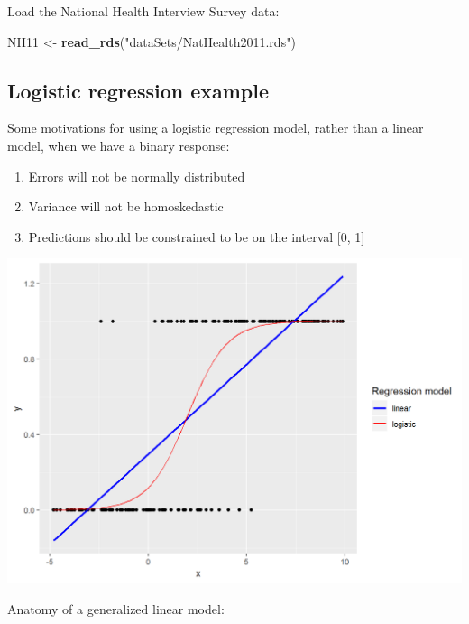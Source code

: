 \documentclass[
]{book}
\newenvironment{Shaded}{\begin{snugshade}}{\end{snugshade}}
\newcommand{\KeywordTok}[1]{\textcolor[rgb]{0.13,0.29,0.53}{\textbf{#1}}}
\newcommand{\NormalTok}[1]{#1}
\newcommand{\StringTok}[1]{\textcolor[rgb]{0.31,0.60,0.02}{#1}}
\providecommand{\tightlist}{%
  \setlength{\itemsep}{0pt}\setlength{\parskip}{0pt}}
\begin{document}
Load the National Health Interview Survey data:

\begin{Shaded}
\begin{Highlighting}[]
\NormalTok{  NH11 \textless{}{-}}\StringTok{ }\KeywordTok{read\_rds}\NormalTok{(}\StringTok{"dataSets/NatHealth2011.rds"}\NormalTok{)}
\end{Highlighting}
\end{Shaded}

\hypertarget{logistic-regression-example}{%
\subsection{Logistic regression example}\label{logistic-regression-example}}

Some motivations for using a logistic regression model, rather than a linear model, when we have a binary response:

\begin{enumerate}
\def\labelenumi{\arabic{enumi}.}
\tightlist
\item
  Errors will not be normally distributed
\item
  Variance will not be homoskedastic
\item
  Predictions should be constrained to be on the interval {[}0, 1{]}
\end{enumerate}

\includegraphics{R/Rmodels/images/logistic.png}

Anatomy of a generalized linear model:
\end{document}
